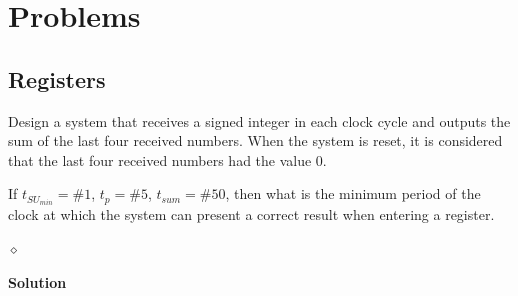 \section{Problems}
\subsection{Registers}

\begin{problem}\label{mean}
Design a system that receives a signed integer in each clock cycle and outputs the sum of the last four received numbers. When the system is reset, it is considered that the last four received numbers had the value 0.

If $t_{SU_{min}} = \#1$, $t_p = \#5$, $t_{sum} = \#50$, then what is the minimum period of the clock at which the system can present a correct result when entering a register.

$\diamond$
\end{problem}

{\bf Solution}

